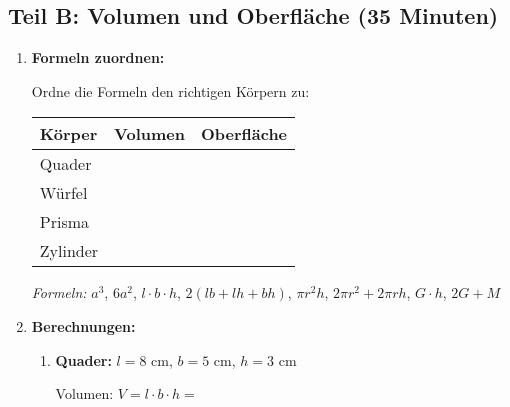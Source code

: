 \subsection*{Teil B: Volumen und Oberfläche (35 Minuten)}

\begin{enumerate}[label=\arabic*.,resume]

    \item \textbf{Formeln zuordnen:}

    Ordne die Formeln den richtigen Körpern zu:

    \begin{center}
        \begin{tabular}{|l|c|c|}
            \hline
            \textbf{Körper} & \textbf{Volumen} & \textbf{Oberfläche} \\
            \hline
            Quader & \underline{\hspace{3cm}} & \underline{\hspace{4cm}} \\
            \hline
            Würfel & \underline{\hspace{3cm}} & \underline{\hspace{4cm}} \\
            \hline
            Prisma & \underline{\hspace{3cm}} & \underline{\hspace{4cm}} \\
            \hline
            Zylinder & \underline{\hspace{3cm}} & \underline{\hspace{4cm}} \\
            \hline
        \end{tabular}
    \end{center}

    \textit{Formeln:} $a^3$, $6a^2$, $l \cdot b \cdot h$, $2(lb + lh + bh)$, $\pi r^2 h$, $2\pi r^2 + 2\pi rh$, $G \cdot h$, $2G + M$

    \vspace{1cm}

    \item \textbf{Berechnungen:}

    \begin{enumerate}[label=\alph*)]
        \item \textbf{Quader:} $l = 8$ cm, $b = 5$ cm, $h = 3$ cm

        Volumen: $V = l \cdot b \cdot h = $ \underline{\hspace{6cm}}


\end{enumerate}
\end{enumerate}
